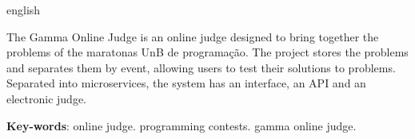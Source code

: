 \begin{resumo}[Abstract]
 \begin{otherlanguage*}{english}
 
   The Gamma Online Judge is an online judge designed to bring together the problems of the maratonas UnB de programação. The project stores the problems and separates them by event, allowing users to test their solutions to problems. Separated into microservices, the system has an interface, an API and an electronic judge.

   \vspace{\onelineskip}
 
   \noindent 
   \textbf{Key-words}: online judge. programming contests. gamma online judge.
   
 \end{otherlanguage*}
\end{resumo}
